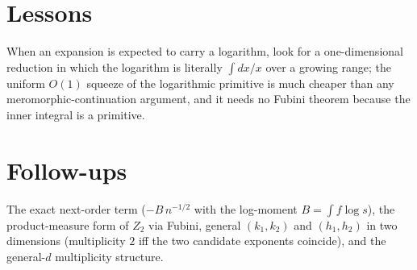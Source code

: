 \documentclass[11pt]{article}
\begin{document}
\section{Lessons}
When an expansion is expected to carry a logarithm, look for a one-dimensional reduction in which the
logarithm is literally $\int dx/x$ over a growing range; the uniform $O(1)$ squeeze of the logarithmic
primitive is much cheaper than any meromorphic-continuation argument, and it needs no Fubini theorem
because the inner integral is a primitive.

\section{Follow-ups}
The exact next-order term ($-B\,n^{-1/2}$ with the log-moment $B=\int f\log s$), the product-measure
form of $Z_2$ via Fubini, general $(k_1,k_2)$ and $(h_1,h_2)$ in two dimensions (multiplicity $2$ iff the
two candidate exponents coincide), and the general-$d$ multiplicity structure.
\end{document}
